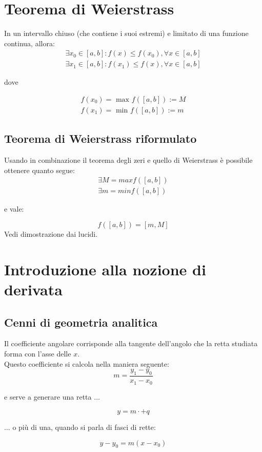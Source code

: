 \documentclass[12pt]{article}
\begin{document}
\section{Teorema di Weierstrass}
In un intervallo chiuso (che contiene i suoi estremi) e limitato di una funzione continua, allora:
\begin{gather}
    \exists x_0 \in [a, b] : f(x) \leq f(x_0), \forall x \in [a, b] \label{teo:weierstrass_1} \\
    \exists x_1 \in [a, b] : f(x_1) \leq f(x), \forall x \in [a, b] \label{teo:weierstrass_2}
\end{gather}
\begin{center}
    dove
\end{center}
\begin{gather*}
    f(x_0) = \text{ max } f([a, b]) := M\\
    f(x_1) = \text{ min } f([a, b]) := m
\end{gather*}
\subsection{Teorema di Weierstrass riformulato}
Usando in combinazione il teorema degli zeri e quello di Weierstrass è possibile ottenere quanto segue:
\begin{gather*}
    \exists M = max f([a, b])\\
    \exists m = min f([a, b])
\end{gather*}
\begin{center}
    e vale:
\end{center}
\begin{equation}
    f([a, b]) = [m, M] \label{teo:weierstrass_espansione}
\end{equation}
Vedi dimostrazione dai lucidi.
\section{Introduzione alla nozione di derivata}
\subsection{Cenni di geometria analitica}
Il coefficiente angolare corrisponde alla tangente dell'angolo che la retta studiata forma con l'asse delle $x$.\\
Questo coefficiente si calcola nella maniera seguente:
\begin{equation}
    m = \dfrac{y_1 - y_0}{x_1 - x_0} \label{eq:coefficiente_angolare}
\end{equation}
\begin{center}
    e serve a generare una retta $\dots$
\end{center}
\begin{equation}
    y = m \cdot + q \label{eq:retta_generica}
\end{equation}
\begin{center}
    $\dots$ o più di una, quando si parla di fasci di rette:
\end{center}
\begin{equation}
    y - y_0 = m(x - x_0) \label{eq:fascio_rette}
\end{equation}
\end{document}
